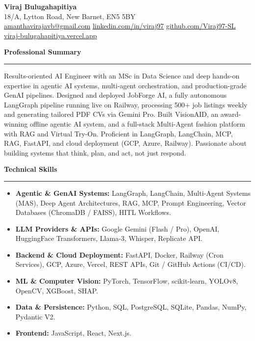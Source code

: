 \documentclass[a4paper,10pt]{article}
\newcommand{\sect}[1]{\vspace{8pt}\noindent\textbf{\color{heading}\large #1}\vspace{3pt}\hrule\vspace{6pt}}
\begin{document}
\begin{center}
  {\LARGE \textbf{Viraj Bulugahapitiya}} \\
  18/A, Lytton Road, New Barnet, EN5 5BY \\
  \vspace{3pt}
  \href{mailto:amanthavirajavb@gmail.com}{\faEnvelope\;amanthavirajavb@gmail.com} \quad
  \href{https://linkedin.com/in/viraj97}{\faLinkedin\;linkedin.com/in/viraj97} \quad
  \href{https://github.com/Viraj97-SL}{\faGithub\;github.com/Viraj97-SL} \quad
  \href{https://viraj-bulugahapitiya.vercel.app}{\faGlobe\;viraj-bulugahapitiya.vercel.app}
\end{center}

\sect{Professional Summary}
Results-oriented AI Engineer with an MSc in Data Science and deep hands-on expertise in agentic AI systems, multi-agent orchestration, and production-grade GenAI pipelines. Designed and deployed JobForge AI, a fully autonomous LangGraph pipeline running live on Railway, processing 500+ job listings weekly and generating tailored PDF CVs via Gemini Pro. Built VisionAID, an award-winning offline agentic AI system, and a full-stack Multi-Agent fashion platform with RAG and Virtual Try-On. Proficient in LangGraph, LangChain, MCP, RAG, FastAPI, and cloud deployment (GCP, Azure, Railway). Passionate about building systems that think, plan, and act, not just respond.

\sect{Technical Skills}
\begin{itemize}[leftmargin=*, itemsep=2pt, topsep=2pt]
    \item \textbf{Agentic \& GenAI Systems:} LangGraph, LangChain, Multi-Agent Systems (MAS), Deep Agent Architectures, RAG, MCP, Prompt Engineering, Vector Databases (ChromaDB / FAISS), HITL Workflows.
    \item \textbf{LLM Providers \& APIs:} Google Gemini (Flash / Pro), OpenAI, HuggingFace Transformers, Llama-3, Whisper, Replicate API.
    \item \textbf{Backend \& Cloud Deployment:} FastAPI, Docker, Railway (Cron Services), GCP, Azure, Vercel, REST APIs, Git / GitHub Actions (CI/CD).
    \item \textbf{ML \& Computer Vision:} PyTorch, TensorFlow, scikit-learn, YOLOv8, OpenCV, XGBoost, SHAP.
    \item \textbf{Data \& Persistence:} Python, SQL, PostgreSQL, SQLite, Pandas, NumPy, Pydantic V2.
    \item \textbf{Frontend:} JavaScript, React, Next.js.
\end{itemize}
\end{document}
